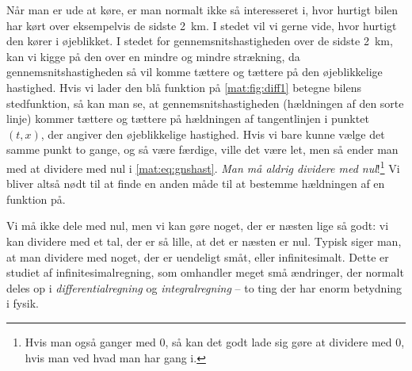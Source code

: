 Når man er ude at køre, er man normalt ikke så interesseret i, hvor hurtigt bilen har kørt over eksempelvis de sidste \SI{2}{\km}. I stedet vil vi gerne vide, hvor hurtigt den kører i øjeblikket. I stedet for gennemsnitshastigheden over de sidste \SI{2}{\km}, kan vi kigge på den over en mindre og mindre strækning, da gennemsnitshastigheden så vil komme tættere og tættere på den øjeblikkelige hastighed. Hvis vi lader den blå funktion på \cref{mat:fig:diff1} betegne bilens stedfunktion, så kan man se, at gennemsnitshastigheden (hældningen af den sorte linje) kommer tættere og tættere på hældningen af tangentlinjen i punktet $(t,x)$, der angiver den øjeblikkelige hastighed.  
Hvis vi bare kunne vælge det samme punkt to gange, og så være færdige, ville det være let, men så ender man med at dividere med nul i \cref{mat:eq:gnshast}. \emph{Man må aldrig dividere med nul}!\footnote{Hvis man også ganger med 0, så kan det godt lade sig gøre at dividere med 0, hvis man ved hvad man har gang i.} Vi bliver altså nødt til at finde en anden måde til at bestemme hældningen af en funktion på. 

Vi må ikke dele med nul, men vi kan gøre noget, der er næsten lige så godt: vi kan dividere med et tal, der er så lille, at det er næsten er nul. Typisk siger man, at man dividere med noget, der er uendeligt småt, eller infinitesimalt. Dette er studiet af infinitesimalregning, som omhandler meget små ændringer, der normalt deles op i \emph{differentialregning} og \emph{integralregning} -- to ting der har enorm betydning i fysik.

